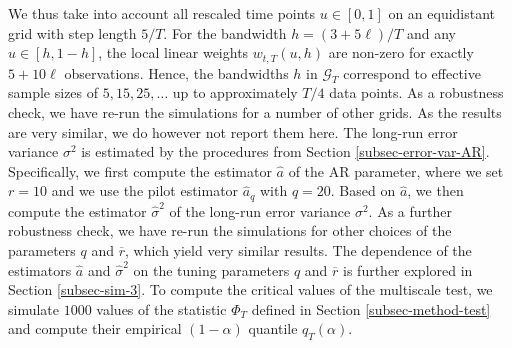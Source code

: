 We thus take into account all rescaled time points $u \in [0,1]$ on an equidistant grid with step length $5/T$. For the bandwidth $h = (3 + 5\ell)/T$ and any $u \in [h,1-h]$, the local linear weights $w_{t,T}(u,h)$ are non-zero for exactly $5 + 10 \ell$ observations. Hence, the bandwidths $h$ in $\mathcal{G}_T$ correspond to effective sample sizes of $5, 15, 25, \ldots$ up to approximately $T/4$ data points. As a robustness check, we have re-run the simulations for a number of other grids. As the results are very similar, we do however not report them here. The long-run error variance $\sigma^2$ is estimated by the procedures from Section \ref{subsec-error-var-AR}. Specifically, we first compute the estimator $\widehat{a}$ of the AR parameter, where we set $r = 10$ and we use the pilot estimator $\widehat{a}_q$ with $q = 20$. Based on $\widehat{a}$, we then compute the estimator $\widehat{\sigma}^2$ of the long-run error variance $\sigma^2$. As a further robustness check, we have re-run the simulations for other choices of the parameters $q$ and $\overline{r}$, which yield very similar results. The dependence of the estimators $\widehat{a}$ and $\widehat{\sigma}^2$ on the tuning parameters $q$ and $\overline{r}$ is further explored in Section \ref{subsec-sim-3}. To compute the critical values of the multiscale test, we simulate $1000$ values of the statistic $\Phi_T$ defined in Section \ref{subsec-method-test} and compute their empirical $(1-\alpha)$ quantile $q_T(\alpha)$. 



